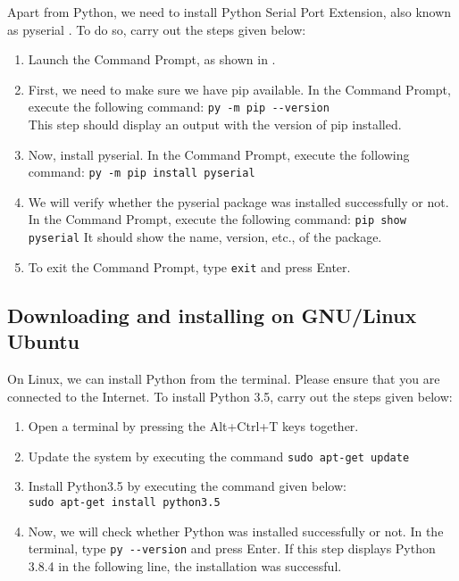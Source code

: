Apart from Python, we need to install Python Serial Port Extension, 
also known as pyserial \cite{pySerial}. To do so, carry out the steps given 
below:
\begin{enumerate}
      \item Launch the Command Prompt, as shown in . 
      \item First, we need to make sure we have pip available. 
      In the Command Prompt, execute the following command: {\tt py -m pip -{}-version} \\ 
      This step should display an output with the version of pip installed. 
      \item Now, install pyserial. In the Command Prompt, execute the following command: 
      {\tt py -m pip install pyserial}  
      \item We will verify whether the pyserial package was installed successfully or not. 
      In the Command Prompt, execute the following command: 
      {\tt pip show pyserial}
      It should show the name, version, etc., of the package. 
      \item To exit the Command Prompt, type {\tt exit} and press Enter. 
\end{enumerate}

\subsection{Downloading and installing on GNU/Linux Ubuntu} \label{py-linux}
On Linux, we can install Python from the terminal. Please ensure that you 
are connected to the Internet. To install Python 3.5, carry out the steps given below:
\begin{enumerate}
      \item Open a terminal by pressing the Alt+Ctrl+T keys together.
      \item Update the system by executing the command {\tt sudo apt-get update}
      \item Install Python3.5 by executing the command given below:\\
      {\tt sudo apt-get install python3.5}
      \item Now, we will check whether Python was installed 
      successfully or not. In the terminal, type {\tt py -{}-version} and 
      press Enter. If this step displays Python 3.8.4 in the following line, 
      the installation was successful. 
\end{enumerate}

